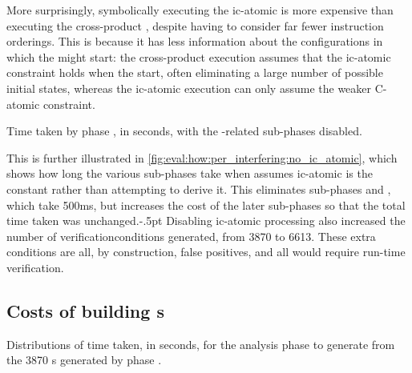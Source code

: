 More surprisingly, symbolically executing the \gls{ic-atomic}
{\StateMachine} is more expensive than executing the cross-product
{\StateMachine}, despite having to consider far fewer instruction
orderings.  This is because it has less information about the
configurations in which the {\StateMachines} might start: the
cross-product execution assumes that the \gls{ic-atomic} constraint
holds when the {\StateMachines} start, often eliminating a large
number of possible initial states, whereas the \gls{ic-atomic}
execution can only assume the weaker C-atomic constraint.

\begin{sanefig}
  \caption{Time taken by phase \subinterfering{}, in seconds, with the
    -related sub-phases disabled.}
  \label{fig:eval:how:per_interfering:no_ic_atomic}
\end{sanefig}

This is further illustrated in
\autoref{fig:eval:how:per_interfering:no_ic_atomic}, which shows how
long the various sub-phases take when {\implementation} assumes
\gls{ic-atomic} is the constant \true rather than attempting to derive
it.  This eliminates sub-phases  and
, which take 500ms, but increases the cost of the
later sub-phases so that the total time taken was
unchanged.\kern-.5pt
Disabling \gls{ic-atomic} processing also increased the number of
\glspl{verificationcondition} generated, from 3870 to 6613.  These
extra conditions are all, by construction, false positives, and all
would require run-time verification.

\subsection{Costs of building s}

\begin{sanefig}
  \caption{Distributions of time taken, in seconds, for the \subenf{}
    analysis phase to generate  from the
    3870 s generated by phase
    \subinterfering{}.}
  \label{fig:eval:how:build_enforcer}
\end{sanefig}

